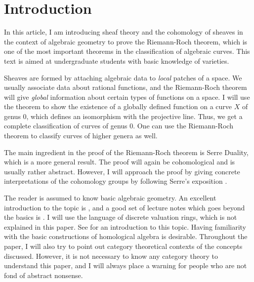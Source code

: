 \section*{Introduction}
In this article, I am introducing sheaf theory and the cohomology of
sheaves in the context of algebraic geometry to prove the Riemann-Roch 
theorem, which is one of the most important theorems in the classification
of algebraic curves. This text is aimed at undergraduate students with
basic knowledge of varieties.

Sheaves are formed by attaching algebraic data to \emph{local} patches of 
a space. We usually associate data about rational functions, and 
the Riemann-Roch theorem will give \emph{global} information about certain 
types of functions on a space. I will use the theorem to show the existence 
of a globally defined function on a curve $X$ of genus 0, which defines 
an isomorphism with the projective line. Thus, we get a complete 
classification of curves of genus 0. One can use the Riemann-Roch theorem 
to classify curves of higher genera as well.

The main ingredient in the proof of the Riemann-Roch theorem is Serre
Duality, which is a more general result. The proof will again
be cohomological and is usually rather abstract. However, I will
approach the proof by giving concrete interpretations of
the cohomology groups by following Serre's exposition \cite{serre}.

The reader is assumed to know basic algebraic geometry. An excellent
introduction to the topic is \cite{reid}, and a good set of lecture notes
which goes beyond the basics is \cite{gathmann}. I will use the language
of discrete valuation rings, which is not explained in this paper. See
\cite{fulton} for an introduction to this topic. Having familiarity with 
the basic constructions of homological algebra is desirable. Throughout 
the paper, I will also try to point out category theoretical contexts of
the concepts discussed. However, it is not necessary to know any category
theory to understand this paper, and I will always place a warning for
people who are not fond of abstract nonsense.
